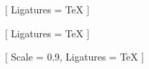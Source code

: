 
\setmainfont{Latin Modern Roman}[
    Ligatures = TeX
]

\setsansfont{Latin Modern Sans}[
    Ligatures = TeX
]

\setmonofont{Latin Modern Mono}[
    Scale = 0.9,
    Ligatures = TeX
]
